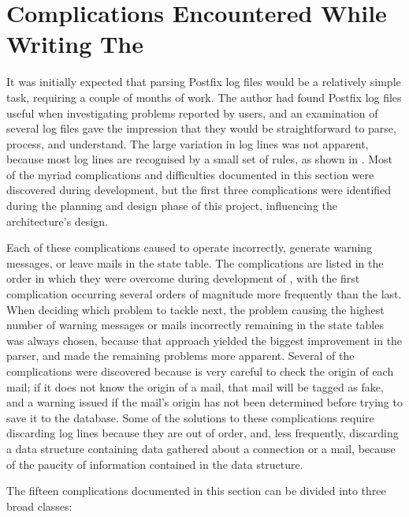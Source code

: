 \section{Complications Encountered While Writing The \parsernamelong{}}

\label{complications}

It was initially expected that parsing Postfix log files would be a
relatively simple task, requiring a couple of months of work.  The author
had found Postfix log files useful when investigating problems reported by
users, and an examination of several log files gave the impression that
they would be straightforward to parse, process, and understand.  The large
variation in log lines was not apparent, because most log lines are
recognised by a small set of rules, as shown in .  Most of the myriad complications and difficulties documented in
this section were discovered during \parsernames{} development, but the
first three complications were identified during the planning and design
phase of this project, influencing the architecture's design.

Each of these complications caused \parsername{} to operate incorrectly,
generate warning messages, or leave mails in the state table.  The
complications are listed in the order in which they were overcome during
development of \parsername{}, with the first complication occurring several
orders of magnitude more frequently than the last.  When deciding which
problem to tackle next, the problem causing the highest number of warning
messages or mails incorrectly remaining in the state tables was always
chosen, because that approach yielded the biggest improvement in the
parser, and made the remaining problems more apparent.  Several of the
complications were discovered because \parsername{} is very careful to
check the origin of each mail; if it does not know the origin of a mail,
that mail will be tagged as fake, and a warning issued if the mail's origin
has not been determined before trying to save it to the database.  Some of
the solutions to these complications require discarding log lines because
they are out of order, and, less frequently, discarding a data structure
containing data gathered about a connection or a mail, because of the
paucity of information contained in the data structure.

The fifteen complications documented in this section can be divided into
three broad classes:


